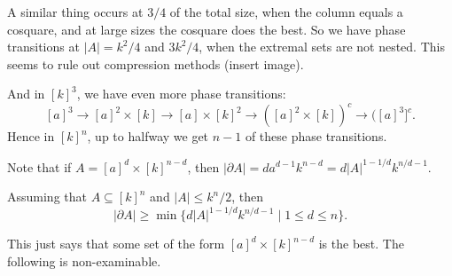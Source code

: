 \documentclass[12pt]{article}
\begin{document}
A similar thing occurs at $3/4$ of the total size, when the column equals a cosquare, and at large sizes the cosquare does the best. So we have phase transitions at $|A| = k^2/4$ and $3k^2/4$, when the extremal sets are not nested. This seems to rule out compression methods (insert image).

And in $[k]^3$, we have even more phase transitions:
\[
	[a]^3 \to [a]^2 \times [k] \to [a] \times [k]^2 \to ([a]^2 \times [k])^{c} \to ([a]^3]^{c}.
\]
Hence in $[k]^{n}$, up to halfway we get $n - 1$ of these phase transitions.


Note that if $A = [a]^{d} \times [k]^{n-d}$, then $|\partial A| = d a^{d-1} k^{n-d} = d |A|^{1 - 1/d} k^{n/d - 1}$.

\begin{theorem}
	Assuming that $A \subseteq [k]^{n}$ and $|A| \leq k^{n}/2$, then
	\[
		|\partial A| \geq \min \{ d |A|^{1 - 1/d} k^{n/d - 1} \mid 1 \leq d\leq n \}.
	\]
\end{theorem}

This just says that some set of the form $[a]^{d} \times [k]^{n-d}$ is the best. The following is non-examinable.
\end{document}
